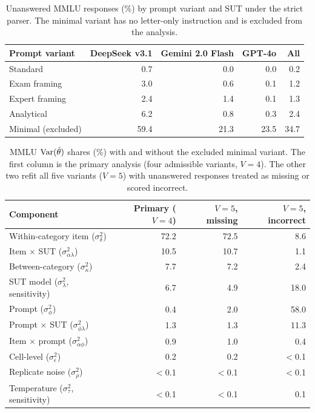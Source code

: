 \begin{table}[ht]
\centering
\small
\caption{Unanswered MMLU responses (\%) by prompt variant and SUT under the strict parser. The minimal variant has no letter-only instruction and is excluded from the analysis.}
\label{tab:mmlu_parse_rates}
\begin{tabular}{lrrrr}
\toprule
\textbf{Prompt variant} & \textbf{DeepSeek v3.1} & \textbf{Gemini 2.0 Flash} & \textbf{GPT-4o} & \textbf{All} \\
\midrule
Standard            & 0.7  & 0.0  & 0.0  & 0.2 \\
Exam framing        & 3.0  & 0.6  & 0.1  & 1.2 \\
Expert framing      & 2.4  & 1.4  & 0.1  & 1.3 \\
Analytical          & 6.2  & 0.8  & 0.3  & 2.4 \\
Minimal (excluded)  & 59.4 & 21.3 & 23.5 & 34.7 \\
\bottomrule
\end{tabular}
\end{table}

\begin{table}[ht]
\centering
\small
\caption{MMLU $\operatorname{Var}(\hat\theta)$ shares (\%) with and without the excluded minimal variant. The first column is the primary analysis (four admissible variants, $V{=}4$). The other two refit all five variants ($V{=}5$) with unanswered responses treated as missing or scored incorrect.}
\label{tab:mmlu_v5}
\begin{tabular}{lrrr}
\toprule
\textbf{Component} & \textbf{Primary ($V{=}4$)} & \textbf{$V{=}5$, missing} & \textbf{$V{=}5$, incorrect} \\
\midrule
Within-category item ($\sigma^2_\delta$) & 72.2 & 72.5 & 8.6 \\
Item $\times$ SUT ($\sigma^2_{\alpha\lambda}$) & 10.5 & 10.7 & 1.1 \\
Between-category ($\sigma^2_\kappa$) & 7.7 & 7.2 & 2.4 \\
SUT model ($\sigma^2_\lambda$, sensitivity) & 6.7 & 4.9 & 18.0 \\
Prompt ($\sigma^2_\phi$) & 0.4 & 2.0 & 58.0 \\
Prompt $\times$ SUT ($\sigma^2_{\phi\lambda}$) & 1.3 & 1.3 & 11.3 \\
Item $\times$ prompt ($\sigma^2_{\alpha\phi}$) & 0.9 & 1.0 & 0.4 \\
Cell-level ($\sigma^2_\epsilon$) & 0.2 & 0.2 & $<$0.1 \\
Replicate noise ($\sigma^2_\rho$) & $<$0.1 & $<$0.1 & $<$0.1 \\
Temperature ($\sigma^2_\tau$, sensitivity) & $<$0.1 & $<$0.1 & 0.1 \\
\bottomrule
\end{tabular}
\end{table}


